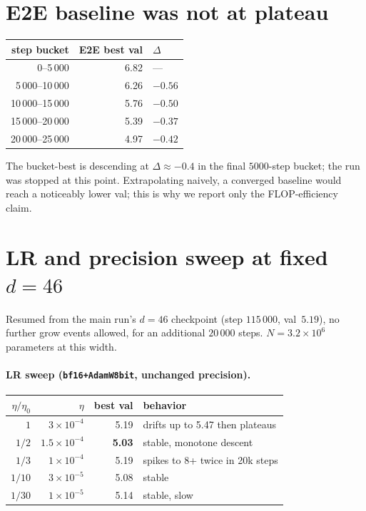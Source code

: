 \documentclass{article}
\begin{document}
\section{E2E baseline was not at plateau}
\label{app:e2e-not-plateau}
\begin{center}
\begin{tabular}{rrl}
\toprule
step bucket & E2E best val & $\Delta$ \\
\midrule
0--5\,000     & 6.82 & --- \\
5\,000--10\,000   & 6.26 & $-0.56$ \\
10\,000--15\,000  & 5.76 & $-0.50$ \\
15\,000--20\,000  & 5.39 & $-0.37$ \\
20\,000--25\,000  & 4.97 & $-0.42$ \\
\bottomrule
\end{tabular}
\end{center}
The bucket-best is descending at $\Delta \approx -0.4$ in the final
$5000$-step bucket; the run was stopped at this point.  Extrapolating
naively, a converged baseline would reach a noticeably lower val; this is
why we report only the FLOP-efficiency claim.

\section{LR and precision sweep at fixed $d=46$}
\label{app:lr-sweep}
Resumed from the main run's $d=46$ checkpoint (step $115\,000$,
val~$5.19$), no further grow events allowed, for an additional
$20\,000$ steps.  $N=3.2\!\times\!10^{6}$ parameters at this width.

\paragraph{LR sweep (\texttt{bf16+AdamW8bit}, unchanged precision).}
\begin{center}
\begin{tabular}{rrr l}
\toprule
$\eta/\eta_0$ & $\eta$ & best val & behavior \\
\midrule
$1$       & $3{\times}10^{-4}$  & 5.19 & drifts up to 5.47 then plateaus \\
$1/2$     & $1.5{\times}10^{-4}$& \textbf{5.03} & stable, monotone descent \\
$1/3$     & $1{\times}10^{-4}$  & 5.19 & spikes to 8+ twice in 20k steps \\
$1/10$    & $3{\times}10^{-5}$  & 5.08 & stable \\
$1/30$    & $1{\times}10^{-5}$  & 5.14 & stable, slow \\
\bottomrule
\end{tabular}
\end{center}
\end{document}
